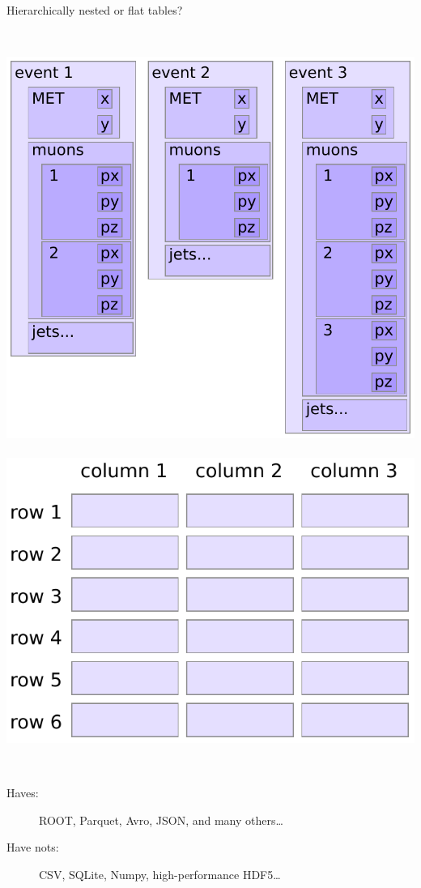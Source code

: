 \documentclass[aspectratio=169]{beamer}
\begin{document}
\begin{frame}{Hierarchically nested or flat tables?}
\begin{columns}
\mbox{ } \hfill \includegraphics[width=\linewidth]{event-structure.pdf} \hfill \hfill \mbox{ }
\mbox{ } \hfill \includegraphics[width=\linewidth]{table-structure.pdf} \hfill \hfill \mbox{ }
\end{columns}

\vfill

\begin{description}
\item[Haves:] ROOT, Parquet, Avro, JSON, and many others\ldots
\item[Have nots:] CSV, SQLite, Numpy, high-performance HDF5\ldots
\end{description}
\end{frame}
\end{document}
